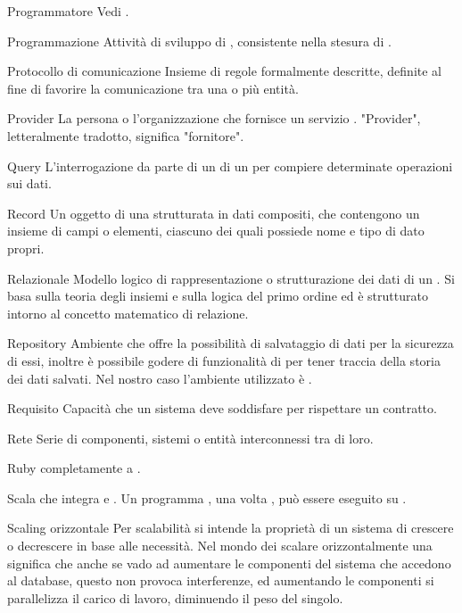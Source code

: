 \elemento
{Programmatore}
{Vedi .}

\elemento
{Programmazione}
{Attività di sviluppo di , consistente nella stesura di .
}

\elemento
{Protocollo di comunicazione}
{Insieme di regole formalmente descritte, definite al fine di favorire la comunicazione tra una o più entità.
}

\elemento
{Provider}
{La persona o l'organizzazione che fornisce un servizio . "Provider", letteralmente tradotto, significa "fornitore".}


\elemento
{Query}
{L'interrogazione da parte di un  di un  per compiere determinate operazioni sui dati.
}


\elemento
{Record}
{Un oggetto di una  strutturata in dati compositi, che contengono un insieme di campi o elementi, ciascuno dei quali possiede nome e tipo di dato propri.}

\elemento
{Relazionale}
{Modello logico di rappresentazione o strutturazione dei dati di un . Si basa sulla teoria degli insiemi e sulla logica del primo ordine ed è strutturato intorno al concetto matematico di relazione.}

\elemento
{Repository}
{Ambiente che offre la possibilità di salvataggio di dati per la sicurezza di essi, inoltre è possibile godere di funzionalità di  per tener traccia della storia dei dati salvati. Nel nostro caso l'ambiente utilizzato è .}

\elemento
{Requisito}
{Capacità che un sistema  deve soddisfare per rispettare un contratto.}

\elemento
{Rete}
{Serie di componenti, sistemi o entità interconnessi tra di loro.}

\elemento
{Ruby}
{ completamente a .}


\elemento
{Scala}
{ che integra  e . Un programma , una volta , può essere eseguito su .}

\elemento
{Scaling orizzontale}
{Per scalabilità si intende la proprietà di un sistema di crescere o decrescere in base alle necessità. Nel mondo dei  scalare orizzontalmente una  significa che anche se vado ad aumentare le componenti del sistema che accedono al database, questo non provoca interferenze, ed aumentando le componenti si parallelizza il carico di lavoro, diminuendo il peso del singolo.
}

